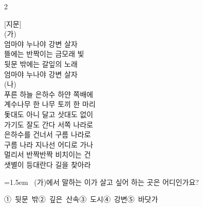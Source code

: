 \documentclass[12pt, a4paper]{article}
\begin{document}
\begin{multicols}{2}
\begin{minipage}{\columnwidth}
\vspace{3mm}
\noindent\hrulefill
\vspace{2.5mm}
\noindent\hrulefill
\vspace{2.5mm}
\noindent\hrulefill
\vspace{2.5mm}
\noindent\hrulefill
\vspace{2.5mm}
\noindent\hrulefill
\vspace{2.5mm}
\vspace{1mm}
\vspace{4mm}
\end{minipage}
\par


\vspace{1mm}
\vspace{0.5mm}

\begin{passagebox}
\noindent{}[지문] \\
(가) \\
엄마야 누나야 강변 살자 \\
뜰에는 반짝이는 금모래 빛 \\
뒷문 밖에는 갈잎의 노래 \\
엄마야 누나야 강변 살자
\\[0.5em]
(나) \\
푸른 하늘 은하수 하얀 쪽배에 \\
계수나무 한 나무 토끼 한 마리 \\
돛대도 아니 달고 삿대도 없이 \\
가기도 잘도 간다 서쪽 나라로
\\[0.5em]
은하수를 건너서 구름 나라로 \\
구름 나라 지나선 어디로 가나 \\
멀리서 반짝반짝 비치이는 건 \\
샛별이 등대란다 길을 찾아라
\end{passagebox}
\vspace{1mm}

\noindent\begin{minipage}{\columnwidth}
\vspace{2mm}
{\hangindent=1.5em  ~(가)에서 말하는 이가 살고 싶어 하는 곳은 어디인가요?\par}

\vspace{0.5mm}
\noindent
\mbox{①~뒷문 밖}\hspace{1em}\mbox{②~깊은 산속}\hspace{1em}\mbox{③~도시}\hspace{1em}\mbox{④~강변}\hspace{1em}\mbox{⑤~바닷가}


\end{minipage}
\end{multicols}
\end{document}
